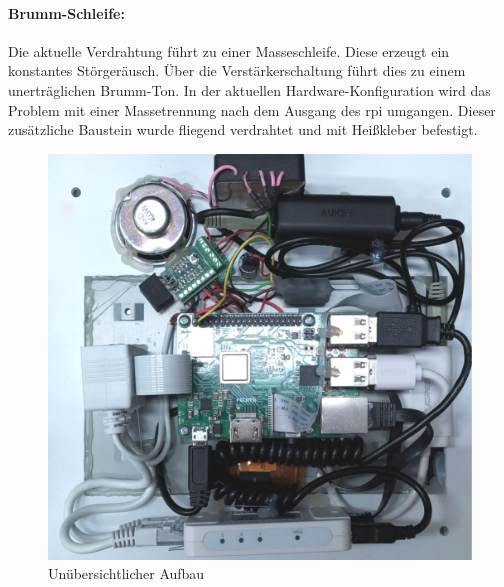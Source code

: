 \paragraph{Brumm-Schleife:} %
Die aktuelle Verdrahtung führt zu einer Masseschleife.
Diese erzeugt ein konstantes Störgeräusch.
Über die Verstärkerschaltung führt dies zu einem unerträglichen Brumm-Ton.
In der aktuellen Hardware-Konfiguration wird das Problem mit einer Massetrennung nach dem Ausgang des \ac{rpi} umgangen.
Dieser zusätzliche Baustein wurde fliegend verdrahtet und mit Heißkleber befestigt.

\begin{figure}[htbp!]
    \centering
    \includegraphics[width=.9\linewidth]{images/ist_situation/fliegender_aufbau.pdf}
    \caption{Unübersichtlicher Aufbau}
    \label{fig:iststand}
\end{figure}